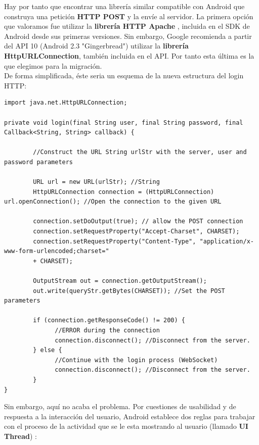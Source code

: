 	 Hay por tanto que encontrar una librería similar compatible con Android que construya una petición \textbf{HTTP POST} y la envíe al servidor. La primera opción que valoramos fue utilizar la \textbf{librería HTTP Apache} \cite{ref:apache_http}, incluida en el SDK de Android desde sus primeras versiones. Sin embargo, Google recomienda \cite{ref:http_recommmendations} a partir del API 10 (Android 2.3 "Gingerbread") utilizar la \textbf{librería HttpURLConnection}\cite{ref:android_httpUrlConnection}, también incluida en el API. Por tanto esta última es la que elegimos para la migración. \\[.2cm] 
	 
	 De forma simplificada, éste seria un esquema de la nueva estructura del login HTTP:
	 
	  \begin{lstlisting}[frame=single]	  
import java.net.HttpURLConnection;

private void login(final String user, final String password, final Callback<String, String> callback) {
  
		//Construct the URL String urlStr with the server, user and password parameters
  
	    URL url = new URL(urlStr); //String 
	    HttpURLConnection connection = (HttpURLConnection) url.openConnection(); //Open the connection to the given URL

	    connection.setDoOutput(true); // allow the POST connection
	    connection.setRequestProperty("Accept-Charset", CHARSET);
	    connection.setRequestProperty("Content-Type", "application/x-www-form-urlencoded;charset="
		+ CHARSET);

	    OutputStream out = connection.getOutputStream(); 
	    out.write(queryStr.getBytes(CHARSET)); //Set the POST parameters

	    if (connection.getResponseCode() != 200) {
		      //ERROR during the connection
		      connection.disconnect(); //Disconnect from the server.
	    } else {
		      //Continue with the login process (WebSocket)
		      connection.disconnect(); //Disconnect from the server.
	    }		      
}	    
	  \end{lstlisting}  
	  
	  Sin embargo, aquí no acaba el problema. Por cuestiones de usabilidad y de respuesta a la interacción del usuario, Android establece dos reglas para trabajar con el proceso de la actividad que se le esta mostrando al usuario (llamado \textbf{UI Thread}) \cite{ref:android_processes}:
	  
